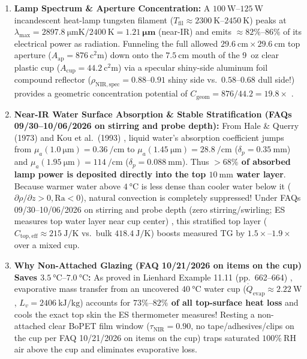 \begin{devicebox}
\begin{enumerate}
  \item \textbf{Lamp Spectrum \& Aperture Concentration:} A $\SIrange{100}{125}{\watt}$ incandescent heat-lamp tungsten filament ($T_{\mathrm{fil}} \approx \SIrange{2300}{2450}{\kelvin}$) peaks at $\lambda_{\max} = \SI{2897.8}{\micro\meter\kelvin} / \SI{2400}{\kelvin} = \mathbf{\SI{1.21}{\micro\meter}}$ (near-IR) and emits $\approx 82\%\text{--}86\%$ of its electrical power as radiation. Funneling the full allowed $\SI{29.6}{\centi\meter} \times \SI{29.6}{\centi\meter}$ top aperture ($A_{\mathrm{ap}} = \SI{876}{\square\centi\meter}$) down onto the $\SI{7.5}{\centi\meter}$ mouth of the \SI{9}{oz} clear plastic cup ($A_{\mathrm{cup}} = \SI{44.2}{\square\centi\meter}$) via a specular shiny-side aluminum foil compound reflector ($\rho_{\mathrm{NIR,spec}} = 0.88\text{--}0.91$ shiny side vs.\ $0.58\text{--}0.68$ dull side!) provides a geometric concentration potential of $C_{\mathrm{geom}} = 876 / 44.2 = \mathbf{19.8\times}$ .
  \item \textbf{Near-IR Water Surface Absorption \& Stable Stratification (FAQs 09/30--10/06/2026 on stirring and probe depth):} From Hale \& Querry (1973) and Kou et al.\ (1993) , liquid water's absorption coefficient jumps from $\mu_a(\SI{1.0}{\micro\meter}) = \SI{0.36}{\per\centi\meter}$ to $\mu_a(\SI{1.45}{\micro\meter}) = \SI{28.8}{\per\centi\meter}$ ($\delta_p = \SI{0.35}{\milli\meter}$) and $\mu_a(\SI{1.95}{\micro\meter}) = \SI{114}{\per\centi\meter}$ ($\delta_p = \SI{0.088}{\milli\meter}$). Thus \textbf{$>68\%$ of absorbed lamp power is deposited directly into the top $\SI{10}{\milli\meter}$ water layer}. Because warmer water above $\SI{4}{\celsius}$ is less dense than cooler water below it ($\partial\rho/\partial z > 0, \mathrm{Ra} < 0$), natural convection is completely suppressed! Under FAQs 09/30--10/06/2026 on stirring and probe depth (zero stirring/swirling; ES measures top water layer near cup center) , this stratified top layer ($C_{\mathrm{top,eff}} \approx \SI{215}{\joule\per\kelvin}$ vs.\ bulk $\SI{418.4}{\joule\per\kelvin}$) boosts measured $\mathrm{TG}$ by \textbf{$1.5\times\text{--}1.9\times$} over a mixed cup.
  \item \textbf{Why Non-Attached Glazing (FAQ 10/21/2026 on items on the cup) Saves $\SIrange{3.5}{7.0}{\celsius}$:} As proved in Lienhard Example 11.11 (pp.\ 662--664) , evaporative mass transfer from an uncovered $\SI{40}{\celsius}$ water cup ($\dot{Q}_{\mathrm{evap}} \approx \SI{2.22}{\watt}$, $L_v = \SI{2406}{\kilo\joule\per\kilogram}$) accounts for \textbf{$73\%\text{--}82\%$ of all top-surface heat loss} and cools the exact top skin the ES thermometer measures! Resting a non-attached clear BoPET film window ($\tau_{\mathrm{NIR}} = 0.90$, no tape/adhesives/clips on the cup per FAQ 10/21/2026 on items on the cup) traps saturated $100\%\ \mathrm{RH}$ air above the cup and eliminates evaporative loss.
\end{enumerate}
\end{devicebox}

